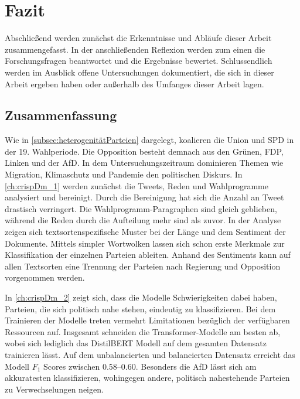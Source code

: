 
\chapter{Fazit} \label{ch:conclusion}

Abschließend werden zunächst die Erkenntnisse und Abläufe dieser Arbeit zusammengefasst. In der anschließenden Reflexion werden zum einen die Forschungsfragen beantwortet und die Ergebnisse bewertet. Schlussendlich werden im Ausblick offene Untersuchungen dokumentiert, die sich in dieser Arbeit ergeben haben oder außerhalb des Umfanges dieser Arbeit lagen.

\section{Zusammenfassung}

Wie in \autoref{subsec:heterogenitätParteien} dargelegt, koalieren die Union und \ac{SPD} in der \num{19}. Wahlperiode. Die Opposition besteht demnach aus den Grünen, \ac{FDP}, Linken und der \ac{AfD}. In dem Untersuchungszeitraum dominieren Themen wie Migration, Klimaschutz und Pandemie den politischen Diskurs. In \autoref{ch:crispDm_1} werden zunächst die Tweets, Reden und Wahlprogramme analysiert und bereinigt. Durch die Bereinigung hat sich die Anzahl an Tweet drastisch verringert. Die Wahlprogramm-Paragraphen sind gleich geblieben, während die Reden durch die Aufteilung mehr sind als zuvor. In der Analyse zeigen sich textsortenspezifische Muster bei der Länge und dem Sentiment der Dokumente. Mittels simpler Wortwolken lassen sich schon erste Merkmale zur Klassifikation der einzelnen Parteien ableiten. Anhand des Sentiments kann auf allen Textsorten eine Trennung der Parteien nach Regierung und Opposition vorgenommen werden.

In \autoref{ch:crispDm_2} zeigt sich, dass die Modelle Schwierigkeiten dabei haben, Parteien, die sich politisch nahe stehen, eindeutig zu klassifizieren. Bei dem Trainieren der Modelle treten vermehrt Limitationen bezüglich der verfügbaren Ressourcen auf. Insgesamt schneiden die Transformer-Modelle am besten ab, wobei sich lediglich das DistilBERT Modell auf dem gesamten Datensatz trainieren lässt. Auf dem unbalancierten und balancierten Datensatz erreicht das Modell \(F_1\) Scores zwischen \numrange{0.58}{0.60}. Besonders die \ac{AfD} lässt sich am akkuratesten klassifizieren, wohingegen andere, politisch nahestehende Parteien zu Verwechselungen neigen.

